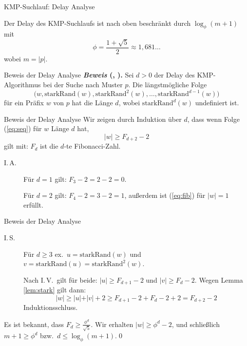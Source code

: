 \documentclass[xcolor=dvipsnames, aspectratio=169]{beamer}
\begin{document}
\begin{frame}{KMP-Suchlauf: Delay Analyse}
\begin{theo}
Der Delay des KMP-Suchlaufs ist nach oben beschränkt durch $\log_\phi(m+1)$ mit \[\phi=\frac{1+\sqrt{5}}{2}\approx 1,681\dots\] wobei $m=\vert p\vert$.
\end{theo}
\end{frame}

\begin{frame}{Beweis der Delay Analyse}
\textbf{\textit{Beweis} (\cite{purdue}, \cite{KnuthMorrisPratt1977}).} Sei $d>0$ der Delay des KMP-Algorithmus bei der Suche nach Muster $p$. Die längstmögliche Folge 
\begin{equation}\label{eq:seq}
\big(w, \mathrm{starkRand}(w), \mathrm{starkRand}^2(w), \dots, \mathrm{starkRand}^{d-1}(w)\big)
\end{equation}
für ein Präfix $w$ von $p$ hat die Länge $d$, wobei $\mathrm{starkRand}^d(w)$ undefiniert ist.
\end{frame}

\begin{frame}{Beweis der Delay Analyse}
Wir zeigen durch Induktion über $d$, dass wenn Folge (\ref{eq:seq}) für $w$ Länge $d$ hat, 
\begin{equation}\label{eq:fib}
\vert w\vert\geq F_{d+2}-2
\end{equation}
gilt mit: $F_{d}$ ist die $d$-te Fibonacci-Zahl.

\begin{description}
\item[I.\,A.] Für $d=1$ gilt: $F_3-2=2-2=0$.

Für $d=2$ gilt: $F_4-2=3-2=1$, außerdem ist (\ref{eq:fib}) für $\vert w\vert=1$ erfüllt.
\end{description}
\end{frame}

\begin{frame}{Beweis der Delay Analyse}
\begin{description}
\item[I.\,S.] Für $d\geq 3$ ex.\ $u=\mathrm{starkRand}(w)$ und $v=\mathrm{starkRand}(u)=\mathrm{starkRand}^2(w)$.

Nach I.\,V.\ gilt für beide: $\vert u\vert\geq F_{d+1}-2$ und $\vert v\vert\geq F_d-2$. Wegen Lemma \ref{lem:stark} gilt dann: \[\vert w\vert\geq \vert u\vert+\vert v\vert+2\geq F_{d+1}-2+F_d-2+2=F_{d+2}-2\]
Induktionsschluss.
\end{description}\medskip

Es ist bekannt, dass $F_d\geq \frac{\phi^d}{\sqrt{5}}$. Wir erhalten $\vert w\vert\geq\phi^d-2$, und schließlich $m+1\geq\phi^d$ bzw.\ $d\leq\log_\phi(m+1)$.\qed 
\end{frame}
\end{document}
